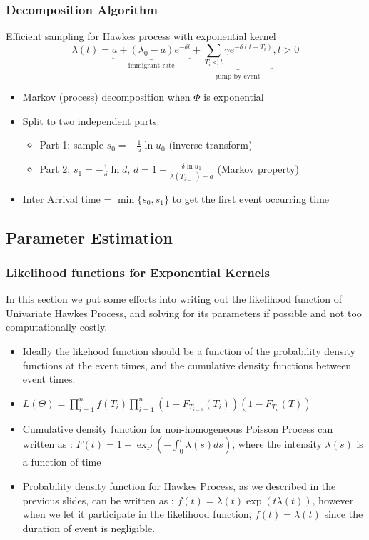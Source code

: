 \documentclass{beamer}
\begin{document}
\begin{frame}
\frametitle{Decomposition Algorithm}
Efficient sampling for Hawkes process with exponential kernel
\[\lambda(t)=\underbrace{a+(\lambda_0-a)e^{-\delta t}}_{\text{immigrant rate}}+\underbrace{\sum_{T_i<t}\gamma e^{-\delta(t-T_i)}}_{\text{jump by event}}, t>0 \]
\begin{itemize}
	\item Markov (process) decomposition when $\Phi$ is exponential
	\item Split to two independent parts:
	\begin{itemize}
		\item Part 1: sample $s_0=-\frac{1}{a}\ln u_0$ (inverse transform)
	\item Part 2: $s_1=-\frac{1}{\delta}\ln d$, $d=1+\frac{\delta \ln u_1}{\lambda(T^+_{i-1})-a}$ (Markov property)
	\end{itemize}
	\item Inter Arrival time = $\min\{s_0,s_1\}$ to get the first event occurring time
\end{itemize}
\end{frame}

\subsection{Parameter Estimation}
\begin{frame}
\frametitle{Likelihood functions for Exponential Kernels}
In this section we put some efforts into writing out the likelihood function of Univariate Hawkes Process, and solving for its parameters if possible and not too computationally costly.
\begin{itemize}
	\item Ideally the likehood function should be a function of the probability density functions at the event times, and the cumulative density functions between event times.
	\item $L(\Theta) = \prod_{i=1}^n f(T_{i}) \prod_{i=1}^n (1-F_{T_{i-1}}(T_i)) (1-F_{T_{n}}(T))$
	\item Cumulative density function for non-homogeneous Poisson Process can written as : $F(t) = 1 - \exp(-\int_0^t \lambda(s) ds)$, where the intensity $\lambda(s)$ is a function of time
	\item Probability density function for Hawkes Process, as we described in the previous slides, can be written as : $f(t) = \lambda(t) \exp(t\lambda(t))$, however when we let it participate in the likelihood function, $f(t) = \lambda(t)$ since the duration of event is negligible.
\end{itemize}
\end{frame}
\end{document}
